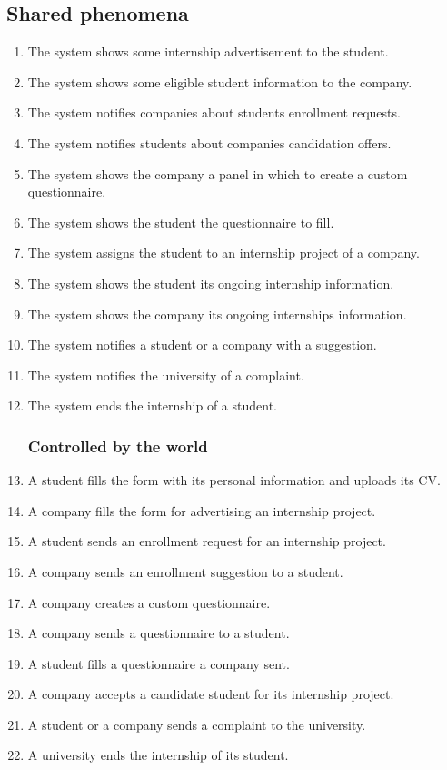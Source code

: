 \subsection{Shared phenomena}

\begin{enumerate}[label=\textbf{SP\arabic* -}]

\subsubsection{Controlled by the machine}

    \item The system shows some internship advertisement to the student.
    \item The system shows some eligible student information to the company.
    \item The system notifies companies about students enrollment requests.
    \item The system notifies students about companies candidation offers.
    \item The system shows the company a panel in which to create a custom questionnaire.
    \item The system shows the student the questionnaire to fill.
    \item The system assigns the student to an internship project of a company.
    \item The system shows the student its ongoing internship information.
    \item The system shows the company its ongoing internships information.
    \item The system notifies a student or a company with a suggestion.
    \item The system notifies the university of a complaint.
    \item The system ends the internship of a student.

\subsubsection{Controlled by the world}

    \item A student fills the form with its personal information and uploads its CV.
    \item A company fills the form for advertising an internship project.
    \item A student sends an enrollment request for an internship project.
    \item A company sends an enrollment suggestion to a student.
    \item A company creates a custom questionnaire.
    \item A company sends a questionnaire to a student.
    \item A student fills a questionnaire a company sent.
    \item A company accepts a candidate student for its internship project.
    \item A student or a company sends a complaint to the university.
    \item A university ends the internship of its student.


\end{enumerate}
